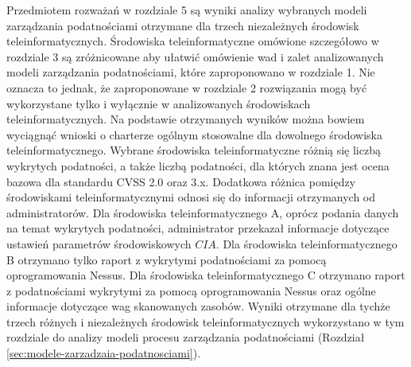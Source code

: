 Przedmiotem rozważań w rozdziale 5 są wyniki analizy wybranych modeli zarządzania podatnościami otrzymane dla trzech niezależnych środowisk teleinformatycznych. Środowiska teleinformatyczne omówione szczegółowo w rozdziale 3 są zróżnicowane aby ułatwić omówienie wad i zalet analizowanych modeli zarządzania podatnościami, które zaproponowano w rozdziale 1. Nie oznacza to jednak, że zaproponowane w rozdziale 2 rozwiązania mogą być wykorzystane tylko i wyłącznie w analizowanych środowiskach teleinformatycznych. Na podstawie otrzymanych wyników można bowiem wyciągnąć wnioski o charterze ogólnym stosowalne dla dowolnego środowiska teleinformatycznego. Wybrane środowiska teleinformatyczne różnią się liczbą wykrytych podatności, a także liczbą podatności, dla których znana jest ocena bazowa dla standardu CVSS 2.0 oraz 3.x. Dodatkowa różnica pomiędzy środowiskami teleinformatycznymi odnosi się do informacji otrzymanych od administratorów. Dla środowiska teleinformatycznego A, oprócz podania danych na temat wykrytych podatności, administrator przekazał informacje dotyczące ustawień parametrów środowiskowych $CIA$. Dla środowiska teleinformatycznego B otrzymano tylko raport z wykrytymi podatnościami za pomocą oprogramowania Nessus. Dla środowiska teleinformatycznego C otrzymano raport z podatnościami wykrytymi za pomocą oprogramowania Nessus oraz ogólne informacje dotyczące wag skanowanych zasobów. Wyniki otrzymane dla tychże trzech różnych i niezależnych środowisk teleinformatycznych wykorzystano w tym rozdziale do analizy modeli procesu zarządzania podatnościami (Rozdział \ref{sec:modele-zarzadzaia-podatnosciami}). 


